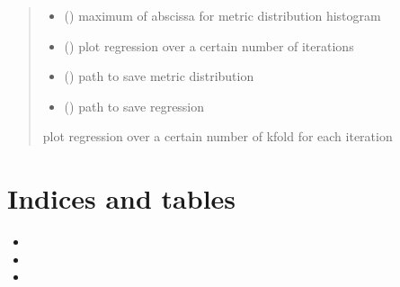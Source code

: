 \documentclass[letterpaper,10pt,english]{sphinxmanual}
\begin{document}
\begin{fulllineitems}
\begin{quote}
\begin{description}
\begin{itemize}
\item {} 
\sphinxAtStartPar
{} () \textendash{} maximum of abscissa for metric distribution histogram

\item {} 
\sphinxAtStartPar
{} () \textendash{} plot regression over a certain number of iterations

\item {} 
\sphinxAtStartPar
{} () \textendash{} path to save metric distribution

\item {} 
\sphinxAtStartPar
{} () \textendash{} path to save regression

\end{itemize}

\item[{Parm int kfold}] \leavevmode
\sphinxAtStartPar
plot regression over a certain number of k\sphinxhyphen{}fold for each iteration

\end{description}\end{quote}

\end{fulllineitems}



\chapter{Indices and tables}
\label{\detokenize{index:indices-and-tables}}\begin{itemize}
\item {} 
\sphinxAtStartPar
{}

\item {} 
\sphinxAtStartPar
{}

\item {} 
\sphinxAtStartPar
{}

\end{itemize}
\end{document}
